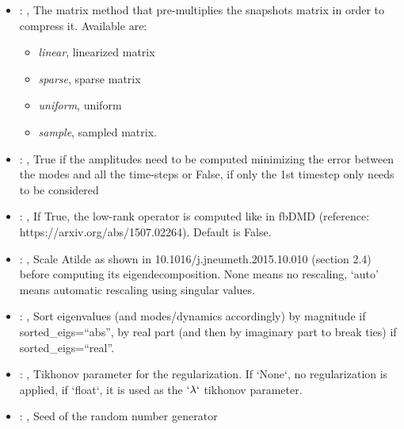 \begin{itemize}
    \item {}: ,
      The matrix method that pre-multiplies the snapshots matrix in order to compress it. Available
      are:                                                   \begin{itemize}
      \item \textit{linear}, linearized matrix
      \item \textit{sparse}, sparse matrix                                                     \item
      \textit{uniform}, uniform                                                     \item
      \textit{sample}, sampled matrix.
      \end{itemize}

    \item {}: ,
      True if the amplitudes need to be computed minimizing the error
      between the modes and all the time-steps or False, if only the 1st timestep only needs to be
      considered

    \item {}: ,
      If True, the low-rank operator is computed like in fbDMD (reference:
      https://arxiv.org/abs/1507.02264).                                                  Default is
      False.

    \item {}: ,
      Scale Atilde as shown in 10.1016/j.jneumeth.2015.10.010 (section 2.4) before computing its
      eigendecomposition. None means no rescaling, ‘auto’ means automatic rescaling using singular
      values.

    \item {}: ,
      Sort eigenvalues (and modes/dynamics accordingly) by magnitude if sorted\_eigs=``abs'',
      by real part (and then by imaginary part to break ties) if sorted\_eigs=``real''.

    \item {}: ,
      Tikhonov parameter for the regularization.                                                  If
      `None`, no regularization is applied, if `float`, it is used as the
      $`\lambda`$ tikhonov parameter.

    \item {}: ,
      Seed of the random number generator
  \end{itemize}

